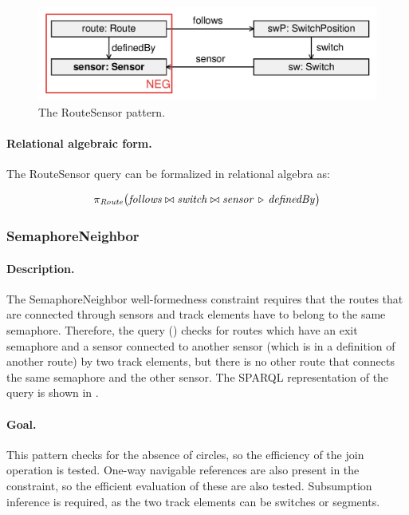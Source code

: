 \begin{figure}[htb]
		\centering
		\includegraphics[scale=0.4]{figures/pattern-routesensor}
		\caption{The \textsf{RouteSensor} pattern.}
		\label{fig:pattern-routesensor}
\end{figure}

\paragraph{Relational algebraic form.}  The \textsf{RouteSensor} query can be formalized in relational algebra as:

\[
\pi_{\mathit{Route}} \big( \mathit{follows} \bowtie \mathit{switch} \bowtie \mathit{sensor} \, \triangleright \, \mathit{definedBy} \big)
\]

\subsubsection{SemaphoreNeighbor}

\paragraph{Description.} The \textsf{SemaphoreNeighbor} well-formedness constraint requires that the routes that are connected through sensors and track elements have to belong to the same semaphore. Therefore, the query () checks for routes which have an exit semaphore and a sensor connected to another sensor (which is in a definition of another route) by two track elements, but there is no other route that connects the same semaphore and the other sensor. The SPARQL representation of the query is shown in .

\paragraph{Goal.} This pattern checks for the absence of circles, so the efficiency of the join operation is tested. One-way navigable references are also present in the constraint, so the efficient evaluation of these are also tested. Subsumption inference is required, as the two track elements can be switches or segments.


